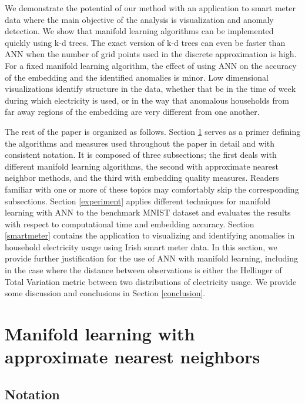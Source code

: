 \documentclass[11pt,a4paper,]{article}
\begin{document}
We demonstrate the potential of our method with an application to smart meter data where the main objective of the analysis is visualization and anomaly detection. We show that manifold learning algorithms can be implemented quickly using k-d trees. The exact version of k-d trees can even be faster than ANN when the number of grid points used in the discrete approximation is high. For a fixed manifold learning algorithm, the effect of using ANN on the accuracy of the embedding and the identified anomalies is minor. Low dimensional visualizations identify structure in the data, whether that be in the time of week during which electricity is used, or in the way that anomalous households from far away regions of the embedding are very different from one another.

The rest of the paper is organized as follows.
Section \ref{mlann} serves as a primer defining the algorithms and measures used throughout the paper in detail and with consistent notation. It is composed of three subsections; the first deals with different manifold learning algorithms, the second with approximate nearest neighbor methods, and the third with embedding quality measures. Readers familiar with one or more of these topics may comfortably skip the corresponding subsections. Section \ref{experiment} applies different techniques for manifold learning with ANN to the benchmark MNIST dataset and evaluates the results with respect to computational time and embedding accuracy. Section \ref{smartmeter} contains the application to visualizing and identifying anomalies in household electricity usage using Irish smart meter data. In this section, we provide further justification for the use of ANN with manifold learning, including in the case where the distance between observations is either the Hellinger of Total Variation metric between two distributions of electricity usage. We provide some discussion and conclusions in Section \ref{conclusion}.

\hypertarget{mlann}{%
\section{Manifold learning with approximate nearest neighbors}\label{mlann}}

\hypertarget{notation}{%
\subsection{Notation}\label{notation}}
\end{document}
